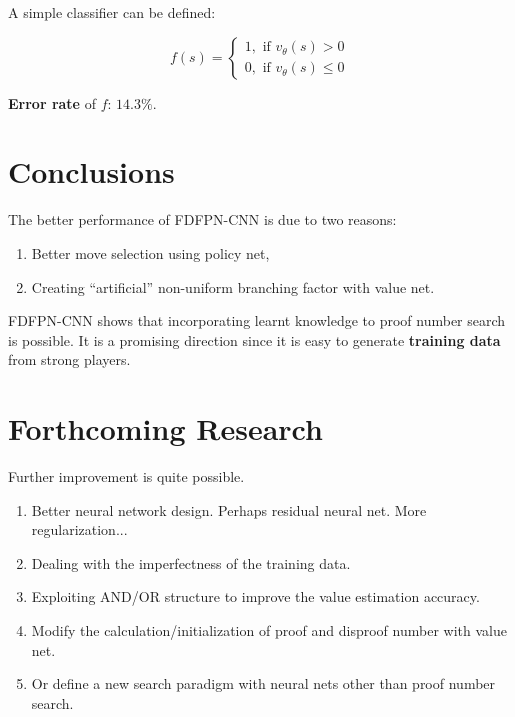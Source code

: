 \documentclass[a0,portrait]{a0poster}
\begin{document}
\begin{multicols}{3}
A simple classifier can be defined:

$$f(s) = \begin{cases}
1, \mbox{ if } v_\theta(s) > 0 \\
0, \mbox{ if } v_\theta(s) \leq 0  
\end{cases}
$$


\textbf{Error rate} of $f$: $14.3\%$. 


\color{SaddleBrown} %

\section*{Conclusions}
The better performance of FDFPN-CNN is due to two reasons:

\begin{enumerate}
\item Better move selection using policy net,
\item Creating ``artificial'' non-uniform branching factor with value net.
\end{enumerate}

FDFPN-CNN shows that incorporating learnt knowledge to proof number search is possible. 
It is a promising direction since it is easy to generate \textbf{training data} from strong players.
 
\color{Black} %


\section*{Forthcoming Research}

Further improvement is quite possible. 
\begin{enumerate}
	\item Better neural network design. Perhaps residual neural net. More regularization...
	\item Dealing with the imperfectness of the training data. 
	\item Exploiting AND/OR structure to improve the value estimation accuracy. 
	\item Modify the calculation/initialization of proof and disproof number with value net.
    \item Or define a new search paradigm with neural nets other than proof number search.
\end{enumerate}


\end{multicols}
\end{document}
